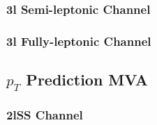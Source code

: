 
\subsubsection{3l Semi-leptonic Channel}
\label{subsec:higgs3lS}




\subsubsection{3l Fully-leptonic Channel}                                  
\label{subsec:higgs3lF}                                                                                                   




\subsection{$p_T$ Prediction MVA}
\label{subsec:ptMVA}

\subsubsection{2lSS Channel}                                                                          
\label{subsec:pt2lSS}                                                                                           



 
